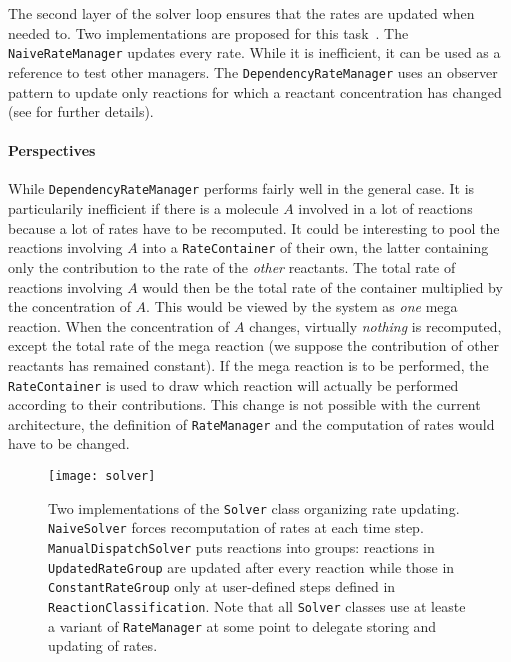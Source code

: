 The second layer of the solver loop ensures that the rates are updated when needed to. Two implementations are proposed for this task~. The \texttt{NaiveRateManager} updates every rate. While it is inefficient, it can be used as a reference to test other managers. The \texttt{DependencyRateManager} uses an observer pattern to update only reactions for which a reactant concentration has changed (see \citet{cati} for further details).

\paragraph{Perspectives} While \texttt{DependencyRateManager} performs fairly well in the general case. It is particularily inefficient if there is a molecule $A$ involved in a lot of reactions because a lot of rates have to be recomputed. It could be interesting to pool the reactions involving $A$ into a \texttt{RateContainer} of their own, the latter containing only the contribution to the rate of the \emph{other} reactants. The total rate of reactions involving $A$ would then be the total rate of the container multiplied by the concentration of $A$. This would be viewed by the system as \emph{one} mega reaction. When the concentration of $A$ changes, virtually \emph{nothing} is recomputed, except the total rate of the mega reaction (we suppose the contribution of other reactants has remained constant). If the mega reaction is to be performed, the \texttt{RateContainer} is used to draw which reaction will actually be performed according to their contributions. This change is not possible with the current architecture, the definition of \texttt{RateManager} and the computation of rates would have to be changed.


\begin{figure}[!h]
  \centering
  \texttt{[image: solver]}
  \caption{Two implementations of the \texttt{Solver} class organizing rate updating. \texttt{NaiveSolver} forces recomputation of rates at each time step. \texttt{ManualDispatchSolver} puts reactions into groups: reactions in \texttt{UpdatedRateGroup} are updated after every reaction while those in \texttt{ConstantRateGroup} only at user-defined steps defined in \texttt{ReactionClassification}. Note that all \texttt{Solver} classes use at leaste a variant of \texttt{RateManager} at some point to delegate storing and updating of rates.}
  \label{fig:solver_details}
\end{figure}

